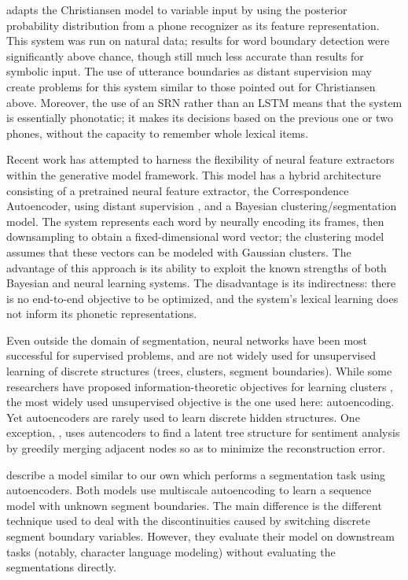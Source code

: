 \documentclass[11pt,letterpaper]{article}
\begin{document}
 adapts the Christiansen model to variable input by
using the posterior probability distribution from a phone recognizer
as its feature representation. This system was run on natural data;
results for word boundary detection were significantly above chance,
though still much less accurate than results for symbolic input. The
use of utterance boundaries as distant supervision may create problems
for this system similar to those pointed out for Christiansen
above. Moreover, the use of an SRN rather than an LSTM means that the
system is essentially phonotatic; it makes its decisions based on the
previous one or two phones, without the capacity to remember whole
lexical items.

Recent work \cite{Kamper16} has attempted to harness the flexibility
of neural feature extractors within the generative model
framework. This model has a hybrid architecture consisting of a
pretrained neural feature extractor, the Correspondence Autoencoder,
using distant supervision \cite{Kamper15}, and a Bayesian
clustering/segmentation model. The system represents each word by
neurally encoding its frames, then downsampling to obtain a
fixed-dimensional word vector; the clustering model assumes that these
vectors can be modeled with Gaussian clusters. The advantage of this
approach is its ability to exploit the known strengths of both
Bayesian and neural learning systems. The disadvantage is its
indirectness: there is no end-to-end objective to be optimized, and
the system's lexical learning does not inform its phonetic
representations.

Even outside the domain of segmentation, neural networks have been
most successful for supervised problems, and are not widely used for
unsupervised learning of discrete structures (trees, clusters, segment
boundaries). While some researchers have proposed
information-theoretic objectives for learning clusters
\cite{Klapper01}, the most widely used unsupervised objective is the
one used here: autoencoding. Yet autoencoders are rarely used to learn
discrete hidden structures. One exception, , uses
autencoders to find a latent tree structure for sentiment analysis by
greedily merging adjacent nodes so as to minimize the reconstruction
error.

 describe a model similar to our own which performs a
segmentation task using autoencoders. Both models use multiscale
autoencoding to learn a sequence model with unknown segment
boundaries. The main difference is the different technique used to
deal with the discontinuities caused by switching discrete segment
boundary variables. However, they evaluate their model on downstream
tasks (notably, character language modeling) without evaluating the
segmentations directly.
\end{document}
